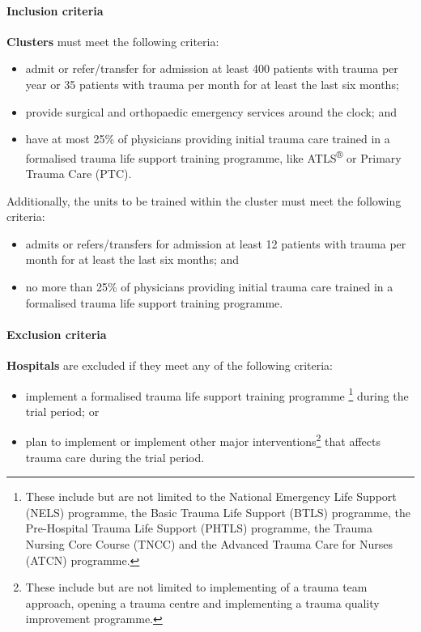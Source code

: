 \documentclass[
]{scrartcl}
\let\oldparagraph\paragraph
\renewcommand{\paragraph}[1]{\oldparagraph{#1}\mbox{}}
\providecommand{\tightlist}{%
  \setlength{\itemsep}{0pt}\setlength{\parskip}{0pt}}\usepackage{longtable,booktabs,array}
\begin{document}
\hypertarget{inclusion-criteria}{%
\paragraph{Inclusion criteria}\label{inclusion-criteria}}

\textbf{Clusters} must meet the following criteria:

\begin{itemize}
\tightlist
\item
  admit or refer/transfer for admission at least 400 patients with
  trauma per year or 35 patients with trauma per month for at least the
  last six months;
\item
  provide surgical and orthopaedic emergency services around the clock;
  and
\item
  have at most 25\% of physicians providing initial trauma care trained
  in a formalised trauma life support training programme, like
  ATLS\textsuperscript{®} or Primary Trauma Care (PTC).
\end{itemize}

Additionally, the units to be trained within the cluster must meet the
following criteria:

\begin{itemize}
\tightlist
\item
  admits or refers/transfers for admission at least 12 patients with
  trauma per month for at least the last six months; and
\item
  no more than 25\% of physicians providing initial trauma care trained
  in a formalised trauma life support training programme.
\end{itemize}

\hypertarget{exclusion-criteria}{%
\paragraph{Exclusion criteria}\label{exclusion-criteria}}

\textbf{Hospitals} are excluded if they meet any of the following
criteria:

\begin{itemize}
\tightlist
\item
  implement a formalised trauma life support training programme
  \footnote{These include but are not limited to the National Emergency
    Life Support (NELS) programme, the Basic Trauma Life Support (BTLS)
    programme, the Pre-Hospital Trauma Life Support (PHTLS) programme,
    the Trauma Nursing Core Course (TNCC) and the Advanced Trauma Care
    for Nurses (ATCN) programme.} during the trial period; or
\item
  plan to implement or implement other major interventions\footnote{These
    include but are not limited to implementing of a trauma team
    approach, opening a trauma centre and implementing a trauma quality
    improvement programme.} that affects trauma care during the trial
  period.
\end{itemize}
\end{document}
